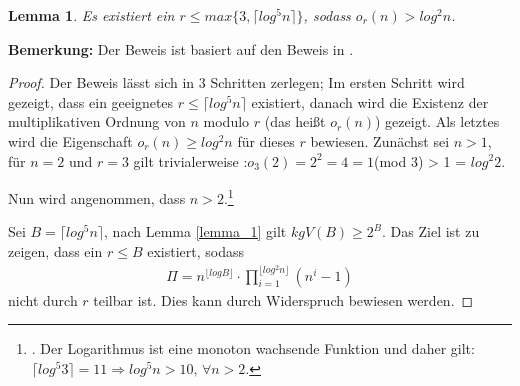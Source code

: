\documentclass[12pt,oneside]{article}
\newtheorem{lemma}[theorem]{Lemma}
\theoremstyle{remark}
\theoremstyle{definition}
\begin{document}
\smallskip

\begin{lemma}\label{limit_of_r}
Es existiert ein $ r \leq max \{ 3, \lceil log^5 n \rceil \}$, sodass $o_{r}(n) > log^2 n$.
\end{lemma}

\textbf{\small{Bemerkung:}} Der Beweis ist basiert auf den Beweis in \cite{online-aks-r-proof}.\newline

\begin{proof}
Der Beweis lässt sich in 3 Schritten zerlegen; Im ersten Schritt wird gezeigt, dass ein geeignetes $r \leq \lceil log^5 n \rceil$ existiert, danach wird die Existenz der multiplikativen Ordnung von $n$ modulo $r$ (das heißt $o_{r}(n)$) gezeigt. Als letztes wird die Eigenschaft $o_{r}(n) \geq log^2 n$ für dieses $r$ bewiesen.\newline\newline
Zunächst sei $n > 1$, für $n = 2$ und $r = 3$ gilt trivialerweise :\newline\newline $o_{3}(2) = 2^2 = 4 = 1 $(mod 3) > 1 = $log^2 2$.

Nun wird angenommen, dass $n > 2$.\footnote{. Der Logarithmus ist eine monoton wachsende Funktion und daher gilt:\newline $\lceil log^5 3 \rceil = 11 \Rightarrow log^5 n > 10, \,  \forall n > 2$.}\newline\newline

Sei $B = \lceil log^5 n \rceil$, nach Lemma \ref{lemma_1} gilt $kgV(B) \geq 2^B$. Das Ziel ist zu zeigen, dass   ein $r \leq B$ existiert, sodass
\begin{align*}\label{prod_cor}
     \Pi = n^{\lfloor log B \rfloor } \cdot \prod_{i = 1}^{\lfloor log^2 n \rfloor} (n^i - 1)
\end{align*}
nicht durch $r$ teilbar ist. Dies kann durch Widerspruch bewiesen werden.


\end{proof}
\end{document}
